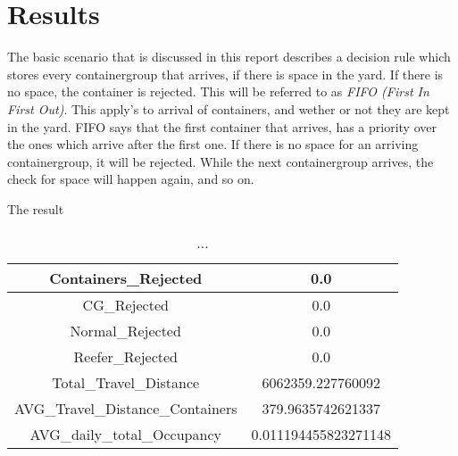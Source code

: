 \documentclass[]{article}
\begin{document}
\section{Results}
The basic scenario that is discussed in this report describes a decision rule
which stores every containergroup that arrives, if there is space in the yard.
If there is no space, the container is rejected. This will be referred to as
\textit{FIFO (First In First Out)}. This apply's to arrival of containers, and
wether or not they are kept in the yard. FIFO says that the first container
that arrives, has a priority over the ones which arrive after the first one. If
there is no space for an arriving containergroup, it will be rejected. While
the next containergroup arrives, the check for space will happen again, and so
on. 

The result 

\begin{table}[h]
      \centering
      \begin{tabular}{|c|c|}
            \hline
            Containers_Rejected            & 0.0                  \\ \hline
            CG_Rejected                    & 0.0                  \\ \hline
            Normal_Rejected                & 0.0                  \\ \hline
            Reefer_Rejected                & 0.0                  \\ \hline
            Total_Travel_Distance          & 6062359.227760092    \\ \hline
            AVG_Travel_Distance_Containers & 379.9635742621337    \\ \hline
            AVG_daily_total_Occupancy      & 0.011194455823271148 \\ \hline
      \end{tabular}
      \caption{...}
\end{table}
\end{document}
